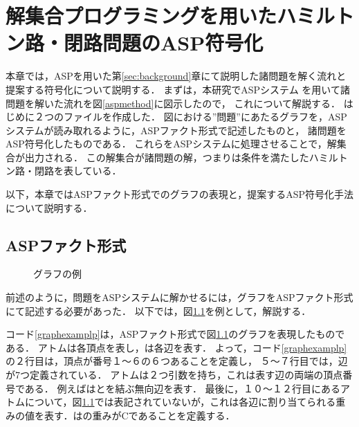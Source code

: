 \chapter{解集合プログラミングを用いたハミルトン路・閉路問題のASP符号化}
本章では，ASPを用いた第\ref{sec:background}章にて説明した諸問題を解く流れと提案する符号化について説明する．
まずは，本研究でASPシステム \clingo を用いて諸問題を解いた流れを図\ref{aspmethod}に図示したので，
これについて解説する．
はじめに２つのファイルを作成した．
図における''問題''にあたるグラフを，ASPシステムが読み取れるように，ASPファクト形式で記述したものと，
諸問題をASP符号化したものである．
これらをASPシステムに処理させることで，解集合が出力される．
この解集合が諸問題の解，つまりは条件を満たしたハミルトン路・閉路を表している．

以下，本章ではASPファクト形式でのグラフの表現と，提案するASP符号化手法について説明する．

\section{ASPファクト形式}
\begin{figure}[tbp]
\begin{center}

\caption{グラフの例}
\label{graphexample}
\end{center}
\end{figure}
前述のように，問題をASPシステムに解かせるには，グラフをASPファクト形式にて記述する必要があった．
以下では，図\ref{graphexample}を例として，解説する．

コード\ref{graphexamplp}は，ASPファクト形式で図\ref{graphexample}のグラフを表現したものである．
アトムは各頂点を表し，は各辺を表す．
よって，コード\ref{graphexamplp}の２行目は，頂点が番号１〜６の６つあることを定義し，
５〜７行目では，辺が7つ定義されている．
アトムは２つ引数を持ち，これは表す辺の両端の頂点番号である．
例えばはとを結ぶ無向辺を表す．
最後に，１０〜１２行目にあるアトムについて，図\ref{graphexample}では表記されていないが，これは各辺に割り当てられる重みの値を表す．はの重みがCであることを定義する．
